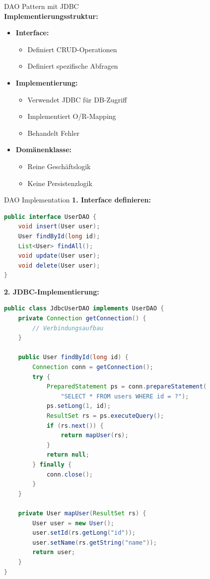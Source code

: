 \begin{concept}{DAO Pattern mit JDBC}\\
\textbf{Implementierungsstruktur:}
\begin{itemize}
    \item \textbf{Interface:}
    \begin{itemize}
        \item Definiert CRUD-Operationen
        \item Definiert spezifische Abfragen
    \end{itemize}
    \item \textbf{Implementierung:}
    \begin{itemize}
        \item Verwendet JDBC für DB-Zugriff
        \item Implementiert O/R-Mapping
        \item Behandelt Fehler
    \end{itemize}
    \item \textbf{Domänenklasse:}
    \begin{itemize}
        \item Reine Geschäftslogik
        \item Keine Persistenzlogik
    \end{itemize}
\end{itemize}
\end{concept}

\begin{example2}{DAO Implementation}
\textbf{1. Interface definieren:}
\begin{lstlisting}[language=Java, style=base]
public interface UserDAO {
    void insert(User user);
    User findById(long id);
    List<User> findAll();
    void update(User user);
    void delete(User user);
}
\end{lstlisting}

\textbf{2. JDBC-Implementierung:}
\begin{lstlisting}[language=Java, style=base]
public class JdbcUserDAO implements UserDAO {
    private Connection getConnection() {
        // Verbindungsaufbau
    }
    
    public User findById(long id) {
        Connection conn = getConnection();
        try {
            PreparedStatement ps = conn.prepareStatement(
                "SELECT * FROM users WHERE id = ?");
            ps.setLong(1, id);
            ResultSet rs = ps.executeQuery();
            if (rs.next()) {
                return mapUser(rs);
            }
            return null;
        } finally {
            conn.close();
        }
    }
    
    private User mapUser(ResultSet rs) {
        User user = new User();
        user.setId(rs.getLong("id"));
        user.setName(rs.getString("name"));
        return user;
    }
}
\end{lstlisting}
\end{example2}

